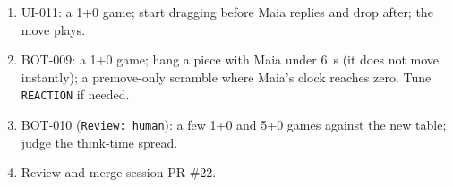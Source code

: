 \documentclass[11pt,a4paper]{article}
\begin{document}
\begin{enumerate}
  \item UI-011: a 1+0 game; start dragging before Maia replies and drop after; the move plays.
  \item BOT-009: a 1+0 game; hang a piece with Maia under 6~s (it does not move instantly);
        a premove-only scramble where Maia's clock reaches zero. Tune \texttt{REACTION} if needed.
  \item BOT-010 (\texttt{Review: human}): a few 1+0 and 5+0 games against the new table;
        judge the think-time spread.
  \item Review and merge session PR \#22.
\end{enumerate}
\end{document}
